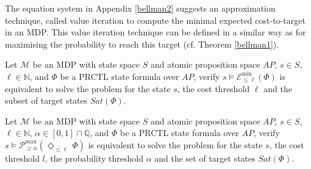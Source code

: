\begin{remark}
  The equation system in Appendix \ref{bellman2} suggests an approximation technique, called value iteration to compute the minimal expected cost-to-target in an MDP.
  This value iteration technique can be defined in a similar way as for maximising the probability to reach this target (cf. Theorem \ref{bellman1}).
\end{remark}

\begin{remark}
  Let $\mathcal{M}$ be an MDP with state space $S$ and atomic proposition space $AP$, $s \in S$, $\ell \in \mathbb{N}$, and $\Phi$ be a PRCTL state formula over $AP$,
  verify $s \models \mathcal{E}^{\min}_{\leq \ell}(\Phi)$ is equivalent to solve the \SSPE{} problem for the state $s$, the cost threshold $\ell$ and the subset of target states $Sat(\Phi)$.
\end{remark}
\begin{remark}
  Let \sloppy$\mathcal{M}$ be an MDP with state space $S$ and atomic proposition space $AP$, $s \in S$, $\ell \in \mathbb{N}$, $\alpha \in [0, 1] \cap \mathbb{Q}$, and $\Phi$ be a PRCTL state formula over $AP$,
  verify $s \models \mathcal{P}^{\max}_{\geq \alpha}(\Diamond_{\leq \ell}\, \Phi)$ is equivalent to solve the \SSPP{} problem for the state $s$, the cost threshold $l$, the probability threshold $\alpha$ and the set of target states $Sat(\Phi)$.
\end{remark}

